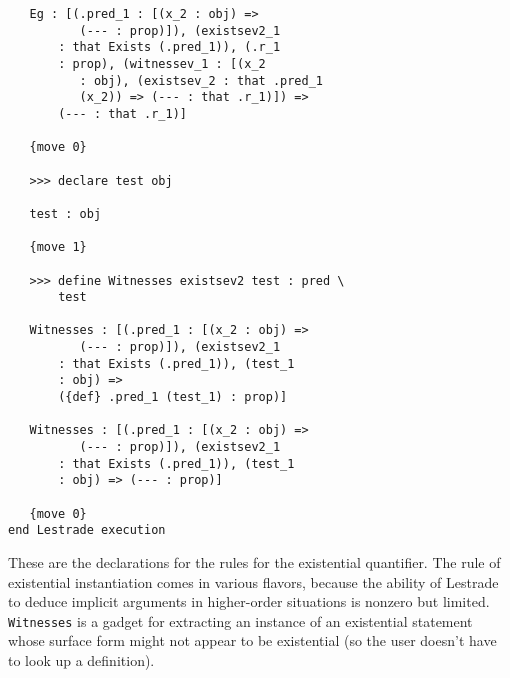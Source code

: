 \documentclass[12pt]{article}
\begin{document}
\begin{verbatim}
   Eg : [(.pred_1 : [(x_2 : obj) => 
          (--- : prop)]), (existsev2_1 
       : that Exists (.pred_1)), (.r_1 
       : prop), (witnessev_1 : [(x_2 
          : obj), (existsev_2 : that .pred_1 
          (x_2)) => (--- : that .r_1)]) => 
       (--- : that .r_1)]

   {move 0}

   >>> declare test obj

   test : obj

   {move 1}

   >>> define Witnesses existsev2 test : pred \
       test

   Witnesses : [(.pred_1 : [(x_2 : obj) => 
          (--- : prop)]), (existsev2_1 
       : that Exists (.pred_1)), (test_1 
       : obj) => 
       ({def} .pred_1 (test_1) : prop)]

   Witnesses : [(.pred_1 : [(x_2 : obj) => 
          (--- : prop)]), (existsev2_1 
       : that Exists (.pred_1)), (test_1 
       : obj) => (--- : prop)]

   {move 0}
end Lestrade execution
\end{verbatim}

These are the declarations for the rules for the existential quantifier.  The rule of existential instantiation comes in various flavors, because the ability of
Lestrade to deduce implicit arguments in higher-order situations is nonzero but limited.  {\tt Witnesses} is a gadget for extracting an instance of an existential statement whose
surface form might not appear to be existential (so the user doesn't have to look up a definition).
\end{document}
